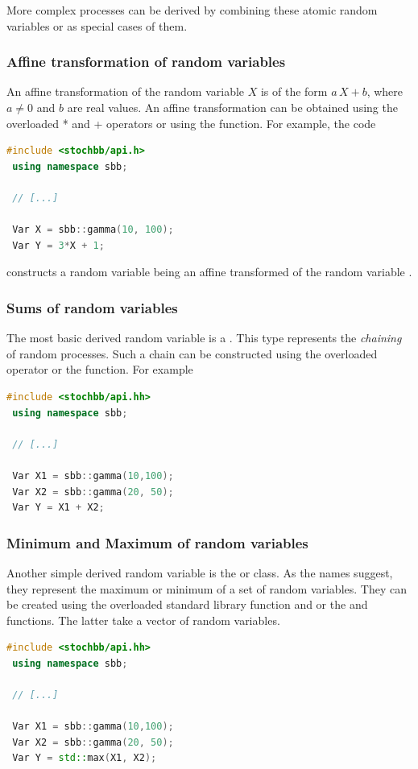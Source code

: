\documentclass[a4paper, 10pt]{paper}
\begin{document}
More complex processes can be derived by combining these atomic random variables or as special cases of them.

\subsubsection{Affine transformation of random variables}
An affine transformation of the random variable $X$ is of the form $a\,X+b$, where $a\neq 0$ and $b$ are
real values. An affine transformation can be obtained using the overloaded * and + operators or using the
 function. For example, the code
\begin{lstlisting}[language=C++]
 #include <stochbb/api.h>
 using namespace sbb;
 
 // [...]
 
 Var X = sbb::gamma(10, 100);
 Var Y = 3*X + 1;
\end{lstlisting}
constructs a random variable  being an affine transformed of the random variable .

\subsubsection{Sums of random variables}
The most basic derived random variable is a . This type represents the \emph{chaining} of
random processes. Such a chain can be constructed using the overloaded \code{+} operator
or the  function. For example
\begin{lstlisting}[language=C++]
 #include <stochbb/api.hh>
 using namespace sbb;

 // [...]

 Var X1 = sbb::gamma(10,100);
 Var X2 = sbb::gamma(20, 50);
 Var Y = X1 + X2;
\end{lstlisting}

\subsubsection{Minimum and Maximum of random variables}
Another simple derived random variable is the  or  class. As the
names suggest, they represent the maximum or minimum of a set of random variables. They can be
created using the overloaded standard library function  and  or the
 and  functions. The latter take a vector of random variables.
\begin{lstlisting}[language=C++]
 #include <stochbb/api.hh>
 using namespace sbb;

 // [...]

 Var X1 = sbb::gamma(10,100);
 Var X2 = sbb::gamma(20, 50);
 Var Y = std::max(X1, X2);
\end{lstlisting}
\end{document}
